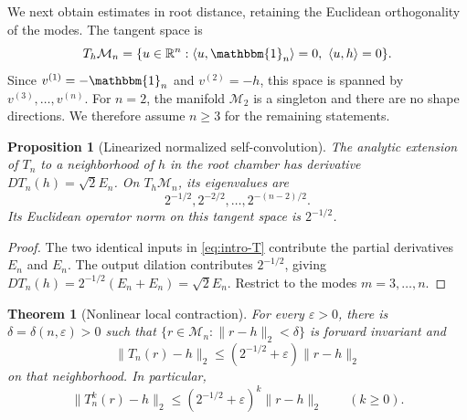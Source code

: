 \documentclass[12pt,reqno]{amsart}
\newtheorem{theorem}{Theorem}[section]
\newtheorem{proposition}[proposition]{Proposition}
\theoremstyle{definition}
\theoremstyle{remark}
\newcommand{\R}{\mathbb R}
\newcommand{\one}{\mathbbm{1}_n}
\newcommand{\cM}{\mathcal M}
\newcommand{\eps}{\varepsilon}
\begin{document}
We next obtain estimates in root distance, retaining the Euclidean
orthogonality of the modes.  The tangent space is
\begin{equation}\label{eq:tangent-space}
 T_h\cM_n=\{u\in\R^n:\langle u,\one\rangle=0,
 \ \langle u,h\rangle=0\}.
\end{equation}
Since \(v^{(1)}=-\one\) and \(v^{(2)}=-h\), this space is spanned by
\(v^{(3)},\ldots,v^{(n)}\).  For \(n=2\), the manifold \(\cM_2\) is a
singleton and there are no shape directions.  We therefore assume
\(n\geq3\) for the remaining statements.

\begin{proposition}[Linearized normalized self-convolution]
\label{prop:linearized-self-convolution}
The analytic extension of \(T_n\) to a neighborhood of \(h\) in the root
chamber has derivative \(DT_n(h)=\sqrt2E_n\).  On \(T_h\cM_n\), its
eigenvalues are
\begin{equation}\label{eq:shape-eigenvalues}
 2^{-1/2},2^{-2/2},\ldots,2^{-(n-2)/2}.
\end{equation}
Its Euclidean operator norm on this tangent space is \(2^{-1/2}\).
\end{proposition}

\begin{proof}
The two identical inputs in \eqref{eq:intro-T} contribute the partial
derivatives \(E_n\) and \(E_n\).  The output dilation contributes
\(2^{-1/2}\), giving
\(DT_n(h)=2^{-1/2}(E_n+E_n)=\sqrt2E_n\).  Restrict
 to the modes \(m=3,\ldots,n\).
\end{proof}

\begin{theorem}[Nonlinear local contraction]
\label{thm:nonlinear-local-contraction}
For every \(\eps>0\), there is \(\delta=\delta(n,\eps)>0\) such that
\(\{r\in\cM_n:\lVert r-h\rVert_2<\delta\}\) is forward invariant and
\begin{equation}\label{eq:one-step-local-contraction}
 \lVert T_n(r)-h\rVert_2
 \leq(2^{-1/2}+\eps)\lVert r-h\rVert_2
\end{equation}
on that neighborhood.  In particular,
\begin{equation}\label{eq:iterated-local-contraction}
 \lVert T_n^k(r)-h\rVert_2
 \leq(2^{-1/2}+\eps)^k\lVert r-h\rVert_2
 \qquad(k\geq0).
\end{equation}
\end{theorem}
\end{document}
